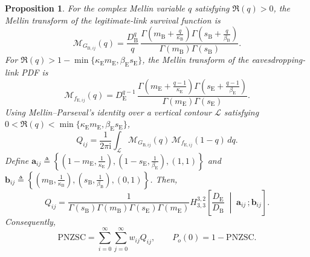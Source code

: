 \documentclass[lettersize,journal]{IEEEtran}
\newtheorem{proposition}{Proposition}
\begin{document}
\begin{proposition}\label{prop:4prime}
For the complex Mellin variable \(q\) satisfying \(\Re(q)>0\), the Mellin transform of the legitimate-link survival function is
\begin{equation}
\mathcal M_{G_{\mathrm B,ij}}(q)
=
\frac{D_{\mathrm B}^q}{q}\,
\frac{\Gamma\!\left(m_{\mathrm B}+\frac{q}{\kappa_{\mathrm B}}\right)
\Gamma\!\left(s_{\mathrm B}+\frac{q}{\beta_{\mathrm B}}\right)}
{\Gamma(m_{\mathrm B})\Gamma(s_{\mathrm B})}.
\label{eq:MG1prime}
\end{equation}
For \(\Re(q)>1-\min\{\kappa_{\mathrm E}m_{\mathrm E},
\beta_{\mathrm E}s_{\mathrm E}\}\), the Mellin transform of the eavesdropping-link PDF is
\begin{equation}
\mathcal M_{f_{\mathrm E,ij}}(q)
=
D_{\mathrm E}^{q-1}\,
\frac{\Gamma\!\left(m_{\mathrm E}+\frac{q-1}{\kappa_{\mathrm E}}\right)
\Gamma\!\left(s_{\mathrm E}+\frac{q-1}{\beta_{\mathrm E}}\right)}
{\Gamma(m_{\mathrm E})\Gamma(s_{\mathrm E})}.
\label{eq:Mkappa2prime}
\end{equation}
Using Mellin--Parseval's identity over a vertical contour \(\mathcal L\) satisfying \(0<\Re(q)<\min\{\kappa_{\mathrm E}m_{\mathrm E},\beta_{\mathrm E}s_{\mathrm E}\}\),
\[
Q_{ij}
=
\frac{1}{2\pi\mathrm i}
\int_{\mathcal L}
\mathcal M_{G_{\mathrm B,ij}}(q)\,
\mathcal M_{f_{\mathrm E,ij}}(1-q)\,dq .
\]
Define \(\mathbf a_{ij}\triangleq\left\{\left(1-m_{\mathrm E},\frac{1}{\kappa_{\mathrm E}}\right),\left(1-s_{\mathrm E},\frac{1}{\beta_{\mathrm E}}\right),(1,1)\right\}\) and \(\mathbf b_{ij}\triangleq\left\{\left(m_{\mathrm B},\frac{1}{\kappa_{\mathrm B}}\right),\left(s_{\mathrm B},\frac{1}{\beta_{\mathrm B}}\right),(0,1)\right\}\).
Then,
\begin{equation}
Q_{ij}
=
\frac{1}
{\Gamma(s_{\mathrm B})\Gamma(m_{\mathrm B})
\Gamma(s_{\mathrm E})\Gamma(m_{\mathrm E})}
H_{3,3}^{3,2}\!\left[
\frac{D_{\mathrm E}}{D_{\mathrm B}}
\;\middle|\;
\mathbf a_{ij}\,;\mathbf b_{ij}
\right].
\label{eq:Qijprime}
\end{equation}
Consequently,
\begin{equation}
\mathrm{PNZSC}
=
\sum_{i=0}^{\infty}\sum_{j=0}^{\infty}w_{ij}Q_{ij},
\qquad
P_o(0)=1-\mathrm{PNZSC}.
\label{eq:PNZSCprime}
\end{equation}
\end{proposition}
\end{document}
